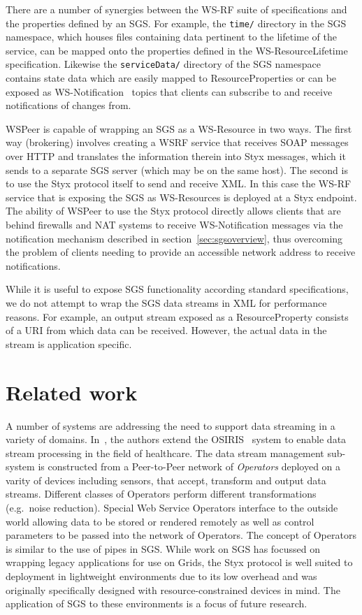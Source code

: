 \documentclass[a4paper]{article}
\begin{document}
There are a number of synergies between the WS-RF suite of specifications and the properties defined by an SGS. For example, the \texttt{time/} directory in the SGS namespace, which houses files containing data pertinent to the lifetime of the service, can be mapped onto the properties defined in the WS-ResourceLifetime~\cite{wsrf-lifetime} specification. Likewise the \texttt{serviceData/} directory of the SGS namespace contains state data which are easily mapped to ResourceProperties or can be exposed as WS-Notification~\cite{wsrf-notification} topics that clients can subscribe to and receive notifications of changes from.

WSPeer is capable of wrapping an SGS as a WS-Resource in two ways.  The first way (brokering) involves creating a WSRF service that receives SOAP messages over HTTP and translates the information therein into Styx messages, which it sends to a separate SGS server (which may be on the same host). The second is to use the Styx protocol itself to send and receive XML. In this case the WS-RF service that is exposing the SGS as WS-Resources is deployed at a Styx endpoint. The ability of WSPeer to use the Styx protocol directly allows clients that are behind firewalls and NAT systems to receive WS-Notification messages via the notification mechanism described in section~\ref{sec:sgsoverview}, thus overcoming the problem of clients needing to provide an accessible network address to receive notifications.

While it is useful to expose SGS functionality according standard specifications, we do not attempt to wrap the SGS data streams in XML for performance reasons. For example, an output stream exposed as a ResourceProperty consists of a URI from which data can be received. However, the actual data in the stream is application specific.


\section{Related work}\label{sec:related}

A number of systems are addressing the need to support data streaming in a variety of domains. In~\cite{brettlecker:2004}, the authors extend the OSIRIS~\cite{schuler:2003} system to enable data stream processing in the field of healthcare. The data stream management sub-system is constructed from a Peer-to-Peer network of \emph{Operators} deployed on a varity of devices including sensors, that accept, transform and output data streams. Different classes of Operators perform different transformations (e.g.\ noise reduction). Special Web Service Operators interface to the outside world allowing data to be stored or rendered remotely as well as control parameters to be passed into the network of Operators. The concept of Operators is similar to the use of pipes in SGS. While work on SGS has focussed on wrapping legacy applications for use on Grids, the Styx protocol is well suited to deployment in lightweight environments due to its low overhead and was originally specifically designed with resource-constrained devices in mind. The application of SGS to these environments is a focus of future research.
\end{document}
